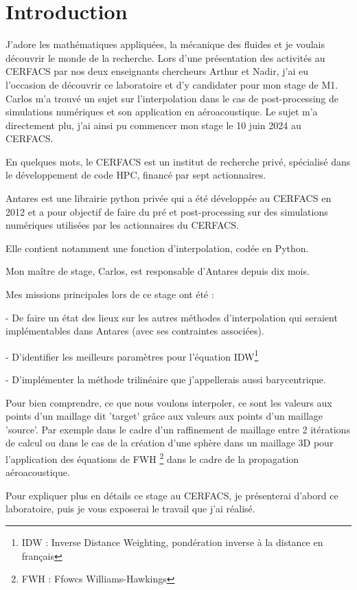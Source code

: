 \section*{Introduction}

J'adore les mathématiques appliquées, la mécanique des fluides et je voulais découvrir le monde de la recherche. Lors d'une présentation des activités au
\ac{CERFACS} par nos deux enseignants chercheurs Arthur et Nadir, j'ai eu l'occasion de découvrir ce laboratoire et d'y candidater pour mon stage de M1. Carlos m'a trouvé un sujet sur l'interpolation dans le cas de post-processing de simulations numériques et son application en aéroacoustique. Le sujet m'a directement plu, j'ai ainsi pu commencer mon stage le 10 juin 2024 au CERFACS.

En quelques mots, le CERFACS est un institut de recherche privé, spécialisé dans le développement de code \ac{HPC}, financé par sept actionnaires.

Antares\cite{antares} est une librairie python privée qui a été développée au CERFACS en 2012 et a pour objectif de faire du pré et post-processing sur des simulations numériques utilisées par les actionnaires du CERFACS.

Elle contient notamment une fonction d'interpolation, codée en Python.

Mon maître de stage, Carlos, est responsable d'Antares depuis dix mois. 

Mes missions principales lors de ce stage ont été :

- De faire un état des lieux sur les autres méthodes d'interpolation qui seraient 
implémentables dans Antares (avec ses contraintes associées).

- D'identifier les meilleurs paramètres pour l'équation IDW\footnote{IDW : Inverse Distance Weighting, pondération inverse à la distance en français}

- D'implémenter la méthode trilinéaire que j'appellerais aussi barycentrique.

Pour bien comprendre, ce que nous voulons interpoler, ce sont les valeurs aux points d'un maillage dit 'target' grâce aux valeurs aux points d'un maillage 'source'. Par exemple dans le cadre d'un raffinement de maillage entre 2 itérations de calcul ou dans le cas de la création d'une sphère dans un maillage 3D pour l'application des équations de FWH \footnote{FWH : Ffowcs Williams-Hawkings} dans le cadre de la propagation aéroacoustique.

Pour expliquer plus en détails ce stage au CERFACS, je présenterai d'abord ce laboratoire, puis je vous exposerai le travail que j'ai réalisé.

% 